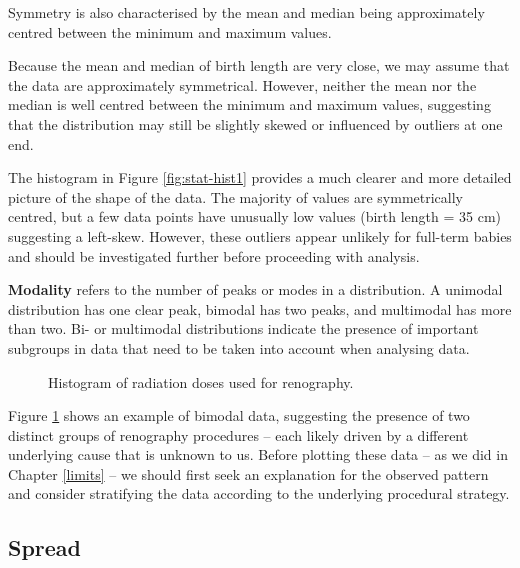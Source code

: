 \documentclass[
]{book}
\makeatletter
\newenvironment{Shaded}{\begin{snugshade}}{\end{snugshade}}
\newcommand{\FunctionTok}[1]{\textcolor[rgb]{0.13,0.29,0.53}{\textbf{#1}}}
\newcommand{\NormalTok}[1]{#1}
\newcommand{\SpecialCharTok}[1]{\textcolor[rgb]{0.81,0.36,0.00}{\textbf{#1}}}
\newcommand*\pandocbounded[1]{%
  \sbox\pandoc@box{#1}%
  \Gscale@div\@tempa{\textheight}{\dimexpr\ht\pandoc@box+\dp\pandoc@box\relax}%
  \Gscale@div\@tempb{\linewidth}{\wd\pandoc@box}%
  \ifdim\@tempb\p@<\@tempa\p@\let\@tempa\@tempb\fi%
  \ifdim\@tempa\p@<\p@\scalebox{\@tempa}{\usebox\pandoc@box}%
  \else\usebox{\pandoc@box}%
  \fi%
}
\makeatother
\begin{document}
Symmetry is also characterised by the mean and median being approximately centred between the minimum and maximum values.

Because the mean and median of birth length are very close, we may assume that the data are approximately symmetrical. However, neither the mean nor the median is well centred between the minimum and maximum values, suggesting that the distribution may still be slightly skewed or influenced by outliers at one end.

The histogram in Figure \ref{fig:stat-hist1} provides a much clearer and more detailed picture of the shape of the data. The majority of values are symmetrically centred, but a few data points have unusually low values (birth length = 35 cm) suggesting a left-skew. However, these outliers appear unlikely for full-term babies and should be investigated further before proceeding with analysis.

\textbf{Modality} refers to the number of peaks or modes in a distribution. A unimodal distribution has one clear peak, bimodal has two peaks, and multimodal has more than two. Bi- or multimodal distributions indicate the presence of important subgroups in data that need to be taken into account when analysing data.

\begin{Shaded}
\end{Shaded}

\begin{figure}
\centering
\pandocbounded{}
\caption{\label{fig:stat-hist2}Histogram of radiation doses used for renography.}
\end{figure}

Figure \ref{fig:stat-hist2} shows an example of bimodal data, suggesting the presence of two distinct groups of renography procedures -- each likely driven by a different underlying cause that is unknown to us. Before plotting these data -- as we did in Chapter \ref{limits} -- we should first seek an explanation for the observed pattern and consider stratifying the data according to the underlying procedural strategy.

\subsection{Spread}\label{spread}
\end{document}
